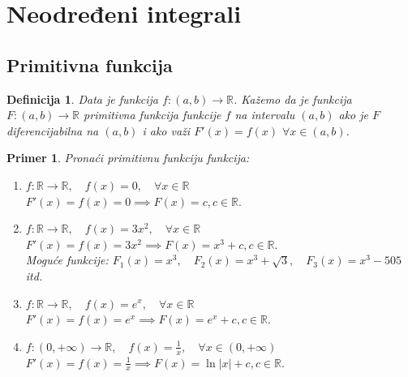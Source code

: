 \documentclass[11pt]{article}
\newcounter{mathitem}
\theoremstyle{plain}
\newtheorem{definicija}[mathitem]{Definicija}
\newtheorem{primer}[mathitem]{Primer}
\theoremstyle{serbnodot}
\begin{document}
\section*{Neodređeni integrali}

\subsection{Primitivna funkcija}

\begin{definicija}
Data je funkcija $ f:(a,b) \to \mathbb{R} $. Kažemo da je funkcija $ F:(a,b) \to \mathbb{R} $ \emph{primitivna funkcija} funkcije $ f $ na intervalu $ (a,b) $ ako je $ F $ diferencijabilna na $ (a,b) $ i ako važi $ F'(x) = f(x)$ $ \forall x \in (a,b) $.

\end{definicija}


\begin{primer}
Pronaći primitivnu funkciju funkcija:
\begin{enumerate}[label=\alph*)] 
    \item $ f:\mathbb{R} \to \mathbb{R}, \quad f(x) = 0, \quad  \forall x \in \mathbb{R} $ \\
    $F'(x) = f(x) = 0 \implies F(x) = c, c \in \mathbb{R}. $ 

    \item $ f:\mathbb{R} \to \mathbb{R}, \quad f(x) = 3x^2, \quad  \forall x \in \mathbb{R} $ \\
    $F'(x) = f(x) = 3x^2 \implies F(x) = x^3 + c, c \in \mathbb{R}. $ \\
    Moguće funkcije: $ F_1(x) = x^3, \quad F_2(x) = x^3 + \sqrt{3}, \quad F_3(x) = x^3 - 505 $ itd.

    \item $ f:\mathbb{R} \to \mathbb{R}, \quad f(x) = e^x, \quad  \forall x \in \mathbb{R} $ \\
    $F'(x) = f(x) = e^x \implies F(x) = e^x + c, c \in \mathbb{R}. $ 


    \item $ f:(0, +\infty) \to \mathbb{R}, \quad f(x) = \frac{1}{x}, \quad  \forall x \in (0,+\infty) $ \\
    $F'(x) = f(x) = \frac{1}{x} \implies F(x) = \ln|x| + c, c \in \mathbb{R}. $ 


  \end{enumerate}
\end{primer}
\end{document}
